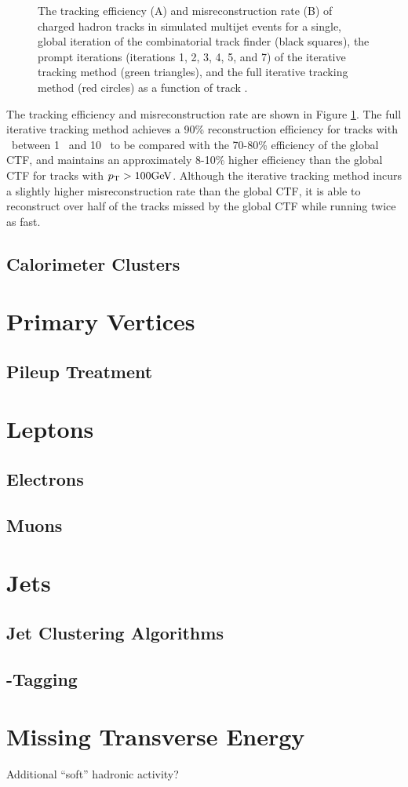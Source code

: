 \begin{figure}[htbp]
{  }
  \caption[Track Reconstruction Performance]{The tracking efficiency (A) and misreconstruction rate (B) of charged hadron tracks in simulated multijet events for a single, global iteration of the combinatorial track finder (black squares), the prompt iterations (iterations 1, 2, 3, 4, 5, and 7) of the iterative tracking method (green triangles), and the full iterative tracking method (red circles) as a function of track \pT.\cite{PARTICLEFLOW}}
    \label{fig:pftrack_perf}
\end{figure}

The tracking efficiency and misreconstruction rate are shown in Figure \ref{fig:pftrack_perf}. The full iterative tracking method achieves a 90\% reconstruction efficiency for tracks with \pT\ between 1 \GeV\ and 10 \GeV\, to be compared with the 70-80\% efficiency of the global CTF, and maintains an approximately 8-10\% higher efficiency than the global CTF for tracks with $p_{\mathrm{T}} > 100 \mathrm{GeV}$. Although the iterative tracking method incurs a slightly higher misreconstruction rate than the global CTF, it is able to reconstruct over half of the tracks missed by the global CTF while running twice as fast.

\subsection{Calorimeter Clusters}

\section{Primary Vertices}

\subsection{Pileup Treatment}

\section{Leptons}

\subsection{Electrons}

\subsection{Muons}\label{muons}

\section{Jets}

\subsection{Jet Clustering Algorithms}

\subsection{\qrkb-Tagging}

\section{Missing Transverse Energy}

Additional ``soft'' hadronic activity?

